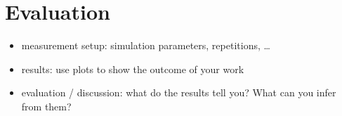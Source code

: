 \section{Evaluation}

\begin{itemize}
\item measurement setup: simulation parameters, repetitions, \dots
\item results: use plots to show the outcome of your work
\item evaluation / discussion: what do the results tell you? What can you infer from them?
\end{itemize}

